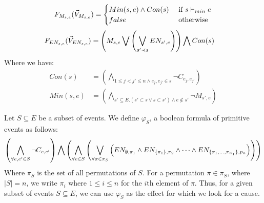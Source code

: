 $$
    F_{M_{s,e}}(\vec V_{M_{s,e}}) = \begin{cases}
        Min(s,e) \wedge Con(s) & \text{ if } s \vdash_{min} e \\
        false                  & \text{ otherwise }
    \end{cases}
$$
\begin{align*}
    F_{EN_{s,e}}(\vec V_{EN_{s,e}}) & =
    \left(
    M_{s,e} \bigvee
    \left(
    \bigvee_{s'\prec s}EN_{s',e}
    \right)
    \right)
    \bigwedge
    Con(s)
\end{align*}
Where we have:
\begin{align*}
    Con(s)   & =   \left(
    \bigwedge_{ 1\leq j<j' \leq n \wedge e_j,e_{j'} \in s}
    \neg C_{e_j,e_{j'}}
    \right)               \\
    Min(s,e) & = \left(
    \bigwedge_{s' \subseteq E. (s' \subset s \vee s \subset s')
        \wedge e \notin s'}
    \neg M_{s',e}
    \right)
\end{align*}

\noindent Let $S \subseteq E$ be a subset of events.
We define $\varphi_S$, a boolean formula of primitive
events as follows:
\begin{align*}
    \left(
        \bigwedge_{\forall e,e' \in S} \neg C_{e,e'}
    \right)
    \bigwedge
    \left(
        \bigwedge_{\forall e \in S}
        \left(
            \bigvee_{\forall \pi \in \pi_S} 
            \left(
                EN_{\emptyset,\pi_1} \wedge
                EN_{\{\pi_1\},\pi_2} \wedge
                \dots
                \wedge
                EN_{\{\pi_1,...,\pi_{n_1}\},p_n}
            \right)
        \right)
    \right)
\end{align*}
\noindent Where $\pi_S$ is the set of all permutations of $S$.
For a permutation $\pi \in \pi_S$, where $|S| = n$, 
we write $\pi_i$ where $1 \leq i \leq n$ for the $i$th 
element of $\pi$.
Thus, for a given subset of events $S \subseteq E$, 
we can use $\varphi_S$ as the effect for which we look
for a cause.


\pagebreak

